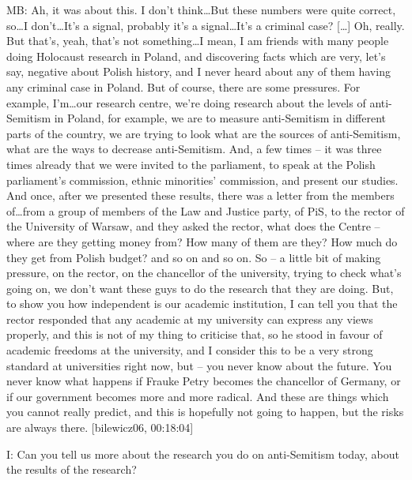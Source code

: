 MB: Ah, it was about this. I don’t think…But these numbers were quite correct, so…I don’t…It’s a signal, probably it’s a signal…It’s a criminal case? […] Oh, really. But that’s, yeah, that’s not something…I mean, I am friends with many people doing Holocaust research in Poland, and discovering facts which are very, let’s say, negative about Polish history, and I never heard about any of them having any criminal case in Poland. But of course, there are some pressures. For example, I’m…our research centre, we’re doing research about the levels of anti-Semitism in Poland, for example, we are to measure anti-Semitism in different parts of the country, we are trying to look what are the sources of anti-Semitism, what are the ways to decrease anti-Semitism. And, a few times – it was three times already that we were invited to the parliament, to speak at the Polish parliament’s commission, ethnic minorities’ commission, and present our studies. And once, after we presented these results, there was a letter from the members of…from a group of members of the Law and Justice party, of PiS, to the rector of the University of Warsaw, and they asked the rector, what does the Centre – where are they getting money from? How many of them are they? How much do they get from Polish budget? and so on and so on. So – a little bit of making pressure, on the rector, on the chancellor of the university, trying to check what’s going on, we don’t want these guys to do the research that they are doing. But, to show you how independent is our academic institution, I can tell you that the rector responded that any academic at my university can express any views properly, and this is not of my thing to criticise that, so he stood in favour of academic freedoms at the university, and I consider this to be a very strong standard at universities right now, but – you never know about the future. You never know what happens if Frauke Petry becomes the chancellor of Germany, or if our government becomes more and more radical. And these are things which you cannot really predict, and this is hopefully not going to happen, but the risks are always there. [bilewicz06, 00:18:04] 

I: Can you tell us more about the research you do on anti-Semitism today, about the results of the research? 

